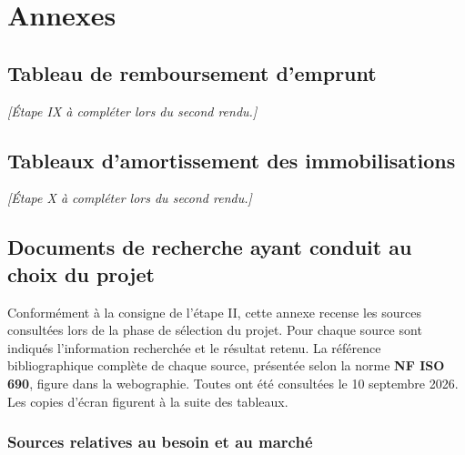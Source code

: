 \clearpage
\section*{Annexes}
\renewcommand{\thesubsection}{Annexe \arabic{subsection}}
\setcounter{subsection}{0}

\subsection{Tableau de remboursement d'emprunt}
\textit{[Étape IX \textendash{} à compléter lors du second rendu.]}

\subsection{Tableaux d'amortissement des immobilisations}
\textit{[Étape X \textendash{} à compléter lors du second rendu.]}

\subsection{Documents de recherche ayant conduit au choix du projet}

Conformément à la consigne de l'étape II, cette annexe recense les sources
consultées lors de la phase de sélection du projet. Pour chaque source sont
indiqués l'information recherchée et le résultat retenu. La référence
bibliographique complète de chaque source, présentée selon la norme
\textbf{NF ISO 690}, figure dans la webographie. Toutes ont été consultées le
10 septembre 2026. Les copies d'écran figurent à la suite des tableaux.

\subsubsection{Sources relatives au besoin et au marché}

